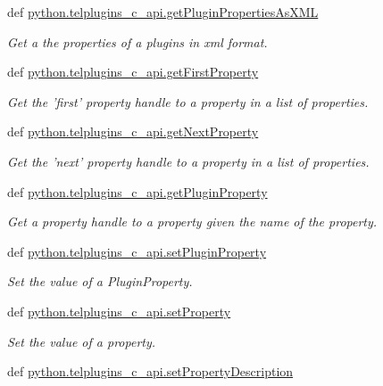 \begin{DoxyCompactItemize}
def \hyperlink{group__plugin__properties_ga56c68a455ca679480cdea007df68de47}{python.\-telplugins\-\_\-c\-\_\-api.\-get\-Plugin\-Properties\-As\-X\-M\-L}
\begin{DoxyCompactList}\small\item\em Get a the properties of a plugins in xml format. \end{DoxyCompactList}\item 
def \hyperlink{group__plugin__properties_ga432c4c14b364ef1fedd00273fa7d7f62}{python.\-telplugins\-\_\-c\-\_\-api.\-get\-First\-Property}
\begin{DoxyCompactList}\small\item\em Get the 'first' property handle to a property in a list of properties. \end{DoxyCompactList}\item 
def \hyperlink{group__plugin__properties_gafd31ee8d1a82dec5c21949c8fd30908e}{python.\-telplugins\-\_\-c\-\_\-api.\-get\-Next\-Property}
\begin{DoxyCompactList}\small\item\em Get the 'next' property handle to a property in a list of properties. \end{DoxyCompactList}\item 
def \hyperlink{group__plugin__properties_ga5e9906f37875dc3d624ae6eebbc4dde4}{python.\-telplugins\-\_\-c\-\_\-api.\-get\-Plugin\-Property}
\begin{DoxyCompactList}\small\item\em Get a property handle to a property given the name of the property. \end{DoxyCompactList}\item 
def \hyperlink{group__plugin__properties_gab2b5334764e9be8b65cfddb3806a5c8f}{python.\-telplugins\-\_\-c\-\_\-api.\-set\-Plugin\-Property}
\begin{DoxyCompactList}\small\item\em Set the value of a Plugin\-Property. \end{DoxyCompactList}\item 
def \hyperlink{group__plugin__properties_ga8d3eb319573b46893ddf413614807647}{python.\-telplugins\-\_\-c\-\_\-api.\-set\-Property}
\begin{DoxyCompactList}\small\item\em Set the value of a property. \end{DoxyCompactList}\item 
def \hyperlink{group__plugin__properties_gaab9ba5f65a756ec0351a98fed0340bc9}{python.\-telplugins\-\_\-c\-\_\-api.\-set\-Property\-Description}

\end{DoxyCompactItemize}
